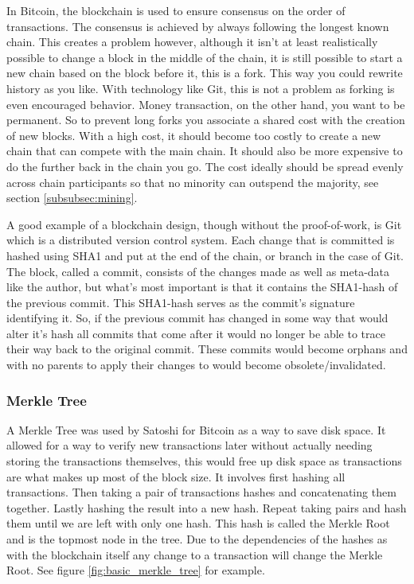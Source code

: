 \documentclass[12pt]{article}
\begin{document}
In Bitcoin, the blockchain is used to ensure consensus on the order of transactions. The consensus is achieved by always following the longest known chain. This creates a problem however, although it isn't at least realistically possible to change a block in the middle of the chain, it is still possible to start a new chain based on the block before it, this is a fork. This way you could rewrite history as you like. With technology like Git, this is not a problem as forking is even encouraged behavior. Money transaction, on the other hand, you want to be permanent. So to prevent long forks you associate a shared cost with the creation of new blocks. With a high cost, it should become too costly to create a new chain that can compete with the main chain. It should also be more expensive to do the further back in the chain you go. The cost ideally should be spread evenly across chain participants so that no minority can outspend the majority, see section \ref{subsubsec:mining}.

A good example of a blockchain design, though without the proof-of-work, is Git which is a distributed version control system. Each change that is committed is hashed using SHA1 and put at the end of the chain, or branch in the case of Git. The block, called a commit, consists of the changes made as well as meta-data like the author, but what's most important is that it contains the SHA1-hash of the previous commit. This SHA1-hash serves as the commit's signature identifying it. So, if the previous commit has changed in some way that would alter it's hash all commits that come after it would no longer be able to trace their way back to the original commit. These commits would become orphans and with no parents to apply their changes to would become obsolete/invalidated.

\subsubsection{Merkle Tree}\label{subsubsec:merkle_tree}

A Merkle Tree was used by Satoshi for Bitcoin as a way to save disk space. It allowed for a way to verify new transactions later without actually needing storing the transactions themselves, this would free up disk space as transactions are what makes up most of the block size. It involves first hashing all transactions. Then taking a pair of transactions hashes and concatenating them together. Lastly hashing the result into a new hash. Repeat taking pairs and hash them until we are left with only one hash. This hash is called the Merkle Root and is the topmost node in the tree. Due to the dependencies of the hashes as with the blockchain itself any change to a transaction will change the Merkle Root. See figure \ref{fig:basic_merkle_tree} for example.
\end{document}
